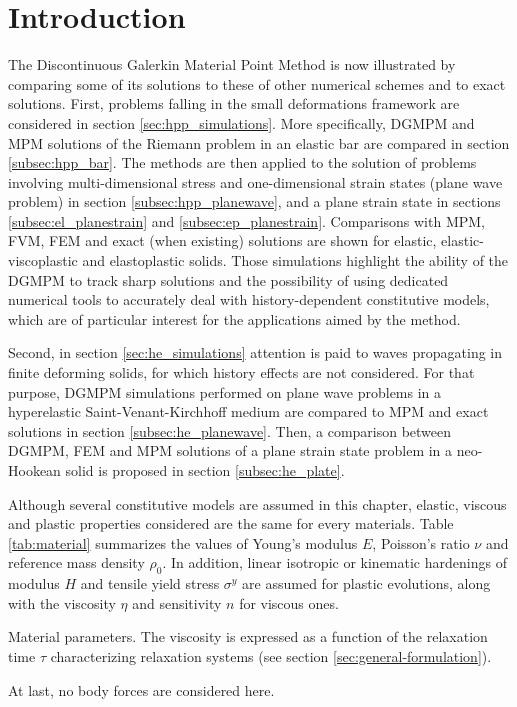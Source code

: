 \section*{Introduction}
The Discontinuous Galerkin Material Point Method is now illustrated by comparing some of its solutions to these of other numerical schemes and to exact solutions.  
First, problems falling in the small deformations framework are considered in section \ref{sec:hpp_simulations}. More specifically, DGMPM and MPM solutions of the Riemann problem in an elastic bar are compared in section \ref{subsec:hpp_bar}. The methods are then applied to the solution of problems involving multi-dimensional stress and one-dimensional strain states (plane wave problem) in section \ref{subsec:hpp_planewave}, and a plane strain state in sections \ref{subsec:el_planestrain} and \ref{subsec:ep_planestrain}. Comparisons with MPM, FVM, FEM and exact (when existing) solutions are shown for elastic, elastic-viscoplastic and elastoplastic solids.
Those simulations highlight the ability of the DGMPM to track sharp solutions and the possibility of using dedicated numerical tools to accurately deal with history-dependent constitutive models, which are of particular interest for the applications aimed by the method. 

Second, in section \ref{sec:he_simulations} attention is paid to waves propagating in finite deforming solids, for which history effects are not considered.
For that purpose, DGMPM simulations performed on plane wave problems in a hyperelastic Saint-Venant-Kirchhoff medium are compared to MPM and exact solutions in section \ref{subsec:he_planewave}. Then, a comparison between DGMPM, FEM and MPM solutions of a plane strain state problem in a neo-Hookean solid is proposed in section \ref{subsec:he_plate}.

Although several constitutive models are assumed in this chapter, elastic, viscous and plastic properties considered are the same for every materials. Table \ref{tab:material} summarizes the values of Young's modulus $E$, Poisson's ratio $\nu$ and reference mass density $\rho_0$.
In addition, linear isotropic or kinematic hardenings of modulus $H$ and tensile yield stress $\sigma^y$ are assumed for plastic evolutions, along with the viscosity $\eta$ and sensitivity $n$ for viscous ones.
\begin{table}[h!]
  \centering
  
  \caption{Material parameters. The viscosity is expressed as a function of the relaxation time $\tau$ characterizing relaxation systems (see section \ref{sec:general-formulation}).}
  \label{tab:material}
\end{table}
At last, no body forces are considered here.
